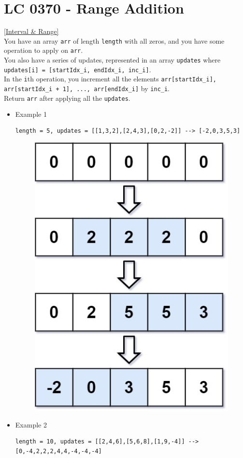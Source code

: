 \section{LC 0370 - Range Addition}\label{lc0370}
\hyperref[sec:interval_range]{[Interval \& Range]}\\

You have an array {\colorbox{CodeBackground}{\lstinline|arr|}} of length {\colorbox{CodeBackground}{\lstinline|length|}} with all zeros, and you have some operation to apply on {\colorbox{CodeBackground}{\lstinline|arr|}}. \\

You also have a series of updates, represented in an array {\colorbox{CodeBackground}{\lstinline|updates|}} where {\colorbox{CodeBackground}{\lstinline|updates[i] = [startIdx_i, endIdx_i, inc_i]|}}.\\

In the {\colorbox{CodeBackground}{\lstinline|i|}}th operation, you increment all the elements {\colorbox{CodeBackground}{\lstinline|arr[startIdx_i], arr[startIdx_i + 1], ..., arr[endIdx_i]|}} by {\colorbox{CodeBackground}{\lstinline|inc_i|}}. \\

Return {\colorbox{CodeBackground}{\lstinline|arr|}} after applying all the {\colorbox{CodeBackground}{\lstinline|updates|}}.\\

\begin{itemize}
\item Example 1
\begin{lstlisting}
length = 5, updates = [[1,3,2],[2,4,3],[0,2,-2]] --> [-2,0,3,5,3]
\end{lstlisting}
\begin{figure}[H]
\centering
\includegraphics[width=0.2\linewidth]{images/lc0370_eg}
\label{fig:lc0370eg}
\end{figure}

\item Example 2
\begin{lstlisting}
length = 10, updates = [[2,4,6],[5,6,8],[1,9,-4]] --> [0,-4,2,2,2,4,4,-4,-4,-4]
\end{lstlisting}
\end{itemize}

